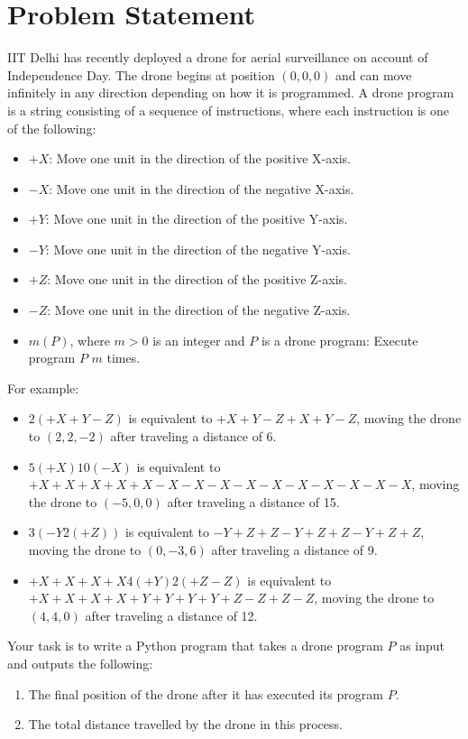 \documentclass{article}
\begin{document}
\section{Problem Statement}
IIT Delhi has recently deployed a drone for aerial surveillance on account of Independence Day. The drone begins at position $(0,0,0)$ and can move infinitely in any direction depending on how it is programmed. A drone program is a string consisting of a sequence of instructions, where each instruction is one of the following:
\begin{itemize}
    \item $+X$: Move one unit in the direction of the positive X-axis.
    \item $-X$: Move one unit in the direction of the negative X-axis.
    \item $+Y$: Move one unit in the direction of the positive Y-axis.
    \item $-Y$: Move one unit in the direction of the negative Y-axis.
    \item $+Z$: Move one unit in the direction of the positive Z-axis.
    \item $-Z$: Move one unit in the direction of the negative Z-axis.
    \item $m(P)$, where $m > 0$ is an integer and $P$ is a drone program: Execute program $P$ $m$ times.
\end{itemize}

For example:
\begin{itemize}
    \item $2(+X+Y-Z)$ is equivalent to $+X+Y-Z+X+Y-Z$, moving the drone to $(2, 2, -2)$ after traveling a distance of 6.
    \item $5(+X)10(-X)$ is equivalent to $+X+X+X+X+X-X-X-X-X-X-X-X-X-X-X$, moving the drone to $(-5, 0, 0)$ after traveling a distance of 15.
    \item $3(-Y2(+Z))$ is equivalent to $-Y+Z+Z-Y+Z+Z-Y+Z+Z$, moving the drone to $(0, -3, 6)$ after traveling a distance of 9.
    \item $+X+X+X+X4(+Y)2(+Z-Z)$ is equivalent to $+X+X+X+X+Y+Y+Y+Y+Z-Z+Z-Z$, moving the drone to $(4, 4, 0)$ after traveling a distance of 12.
\end{itemize}

Your task is to write a Python program that takes a drone program $P$ as input and outputs the following:
\begin{enumerate}
    \item The final position of the drone after it has executed its program $P$.
    \item The total distance travelled by the drone in this process.
\end{enumerate}
\end{document}

